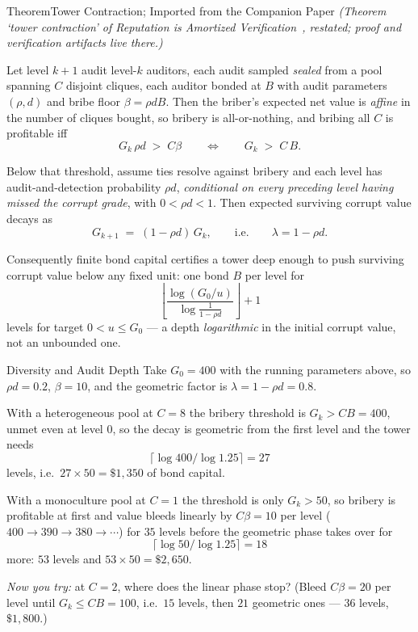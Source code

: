 \documentclass[11pt,a4paper]{article}
\theoremstyle{definition}
\begin{document}
\begin{pdclaim}{Theorem}{Tower Contraction; Imported from the Companion Paper}
\setlength{\parskip}{4pt plus 1pt}
\label{thm:tower-imported}
\emph{(Theorem `tower contraction' of \emph{Reputation is Amortized
Verification}~, restated; proof and verification artifacts
live there.)}

Let level $k{+}1$ audit level-$k$ auditors, each audit sampled
\emph{sealed} from a pool spanning $C$ disjoint cliques, each auditor bonded at $B$
with audit parameters $(\rho,d)$ and bribe floor $\beta=\rho d B$. Then the
briber's expected net value is \emph{affine} in the number of cliques bought, so
bribery is all-or-nothing, and bribing all $C$ is profitable iff
\[
  G_k\,\rho d \;>\; C\beta
  \qquad\Longleftrightarrow\qquad
  G_k \;>\; C\,B .
\]

Below that threshold, assume ties resolve against bribery and each level has
audit-and-detection probability $\rho d$, \emph{conditional on every preceding
level having missed the corrupt grade}, with $0<\rho d<1$. Then expected
surviving corrupt value decays as
\[
  G_{k+1} \;=\; (1-\rho d)\,G_k ,
  \qquad\text{i.e.}\qquad \lambda = 1-\rho d .
\]

Consequently finite bond capital certifies a tower deep enough to push surviving
corrupt value below any fixed unit: one bond $B$ per level for
\[
  \left\lfloor \frac{\log(G_0/u)}{\log\tfrac{1}{1-\rho d}}\right\rfloor+1
\]
levels for target
$0<u\le G_0$ --- a depth
\emph{logarithmic} in the initial corrupt value, not an unbounded one.
\end{pdclaim}

\begin{pdexample}{Diversity and Audit Depth}
\setlength{\parskip}{4pt plus 1pt}
\label{ex:audit-depth}
Take $G_0 = 400$ with the running parameters
above, so $\rho d = 0.2$, $\beta = 10$, and the geometric factor is
$\lambda = 1-\rho d = 0.8$.

With a heterogeneous pool at $C=8$ the bribery
threshold is $G_k > CB = 400$, unmet even at level 0, so the decay is geometric
from the first level and the tower needs
\[
  \lceil \log 400/\log 1.25 \rceil = 27
\]
levels, i.e.\ $27\times 50 = \$1{,}350$ of bond capital.

With a monoculture pool at $C=1$ the threshold is only $G_k > 50$, so
bribery is profitable at first and value bleeds linearly by $C\beta = 10$ per level
($400 \to 390 \to 380 \to\cdots$) for $35$ levels before the geometric phase takes
over for
\[
  \lceil \log 50/\log 1.25\rceil = 18
\]
more: $53$ levels and $53\times 50 = \$2{,}650$.

\emph{Now you try:} at $C=2$, where does the linear
phase stop? (Bleed $C\beta = 20$ per level until $G_k \le CB = 100$, i.e.\ $15$
levels, then $21$ geometric ones --- $36$ levels, $\$1{,}800$.)
\end{pdexample}
\end{document}
